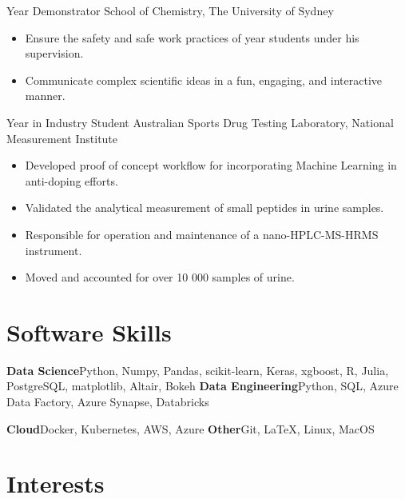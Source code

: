 \vspace{1em}

{ Year Demonstrator}
{School of Chemistry, The University of Sydney}
{}{}
{%
  \begin{itemize}
    \item Ensure the safety and safe work practices
      of  year students under his supervision.
    \item Communicate complex scientific ideas
      in a fun, engaging, and interactive manner.
  \end{itemize}
}

{Year in Industry Student}
{Australian Sports Drug Testing Laboratory, National Measurement Institute}
{}{}
{%
  \begin{itemize}
    \item Developed proof of concept workflow for incorporating Machine
      Learning in anti-doping efforts.
    \item Validated the analytical measurement of small peptides in urine samples.
    \item Responsible for operation and maintenance of a nano-HPLC-MS-HRMS instrument.
    \item Moved and accounted for over 10 000 samples of urine.
  \end{itemize}
}

\section{Software Skills}

\cvcomputer%
{\textbf{Data Science}}{Python, Numpy, Pandas, scikit-learn, Keras, xgboost, R, Julia, PostgreSQL, matplotlib, Altair, Bokeh}
{\textbf{Data Engineering}}{Python, SQL, Azure Data Factory, Azure Synapse, Databricks}

{\textbf{Cloud}}{Docker, Kubernetes, AWS, Azure}
{\textbf{Other}}{Git, \LaTeX, Linux, MacOS}

\section{Interests}

\vspace{2em}


